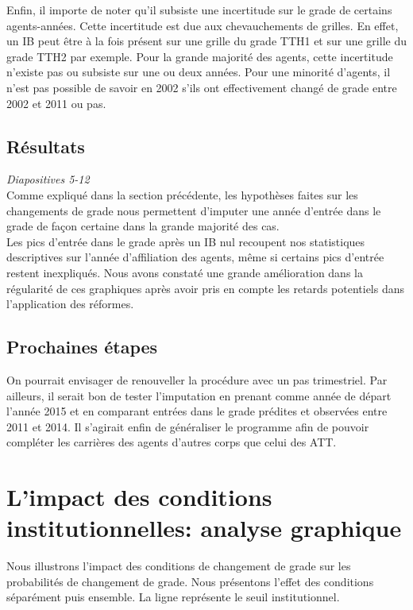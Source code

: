\documentclass[11pt,a4paper]{article}
\begin{document}
Enfin, il importe de noter qu'il subsiste une incertitude sur le grade de certains agents-années. Cette incertitude est due aux chevauchements de grilles. En effet, un IB peut être à la fois présent sur une grille du grade TTH1 et sur une grille du grade TTH2 par exemple. Pour la grande majorité des agents, cette incertitude n'existe pas ou subsiste sur une ou deux années. Pour une minorité d'agents, il n'est pas possible de savoir en 2002 s'ils ont effectivement changé de grade entre 2002 et 2011 ou pas.\\

\subsection{Résultats}

\textit{Diapositives 5-12}\\

Comme expliqué dans la section précédente, les hypothèses faites sur les changements de grade nous permettent d'imputer une année d'entrée dans le grade de façon certaine dans la grande majorité des cas.\\

Les pics d'entrée dans le grade après un IB nul recoupent nos statistiques descriptives sur l'année d'affiliation des agents, même si certains pics d'entrée restent inexpliqués. Nous avons constaté une grande amélioration dans la régularité de ces graphiques après avoir pris en compte les retards potentiels dans l'application des réformes.

\subsection{Prochaines étapes}

On pourrait envisager de renouveller la procédure avec un pas trimestriel.
Par ailleurs, il serait bon de tester l'imputation en prenant comme année de départ l'année 2015 et en comparant entrées dans le grade prédites et observées entre 2011 et 2014.
Il s'agirait enfin de généraliser le programme afin de pouvoir compléter les carrières des agents d'autres corps que celui des ATT.

\section{L'impact des conditions institutionnelles: analyse graphique}

Nous illustrons l'impact des conditions de changement de grade sur les probabilités de changement de grade. Nous présentons l'effet des conditions séparément puis ensemble. La ligne représente le seuil institutionnel. 
\end{document}
